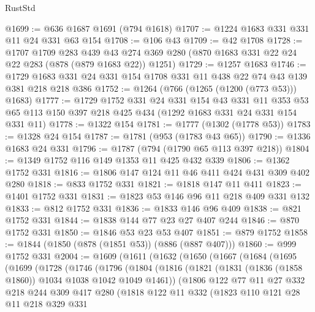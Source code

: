\begin{lexlean}{RustStd}
\begin{coremodule}
@1699 := @636 @1687 @1691 (@794 @1618)
@1707 := @1224 @1683 @331 @331 @11 @24 @331 @63 @154
@1708 := @106 @43
@1709 := @42 @1708
@1728 := @1707
    @1709
    @283
    @439
    @43
    @274
    @369
    @280
    (@870 @1683 @331 @22 @24 @22 @283 (@878 (@879 @1683 @22)) @1251)
@1729 := @1257 @1683
@1746 := @1729 @1683 @331 @24 @331 @154 @1708 @331 @11 @438 @22 @74 @43 @139 @381 @218 @218 @386
@1752 := @1264 (@766 (@1265 (@1200 (@773 @53))) @1683)
@1777 := @1729
    @1752
    @331
    @24
    @331
    @154
    @43
    @331
    @11
    @353
    @53
    @65
    @113
    @150
    @397
    @218
    @425
    @434
    (@1292 @1683 @331 @24 @331 @154 @331 @11)
@1778 := @1322 @154
@1781 := @1777 (@1302 (@1778 @53))
@1783 := @1328 @24 @154
@1787 := @1781 (@953 (@1783 @43 @65))
@1790 := @1336 @1683 @24 @331
@1796 := @1787 (@794 (@1790 @65 @113 @397 @218))
@1804 := @1349 @1752 @116 @149 @1353 @11 @425 @432 @339
@1806 := @1362 @1752 @331
@1816 := @1806 @147 @124 @11 @46 @411 @424 @431 @309 @402 @280
@1818 := @833 @1752 @331
@1821 := @1818 @147 @11 @411
@1823 := @1401 @1752 @331
@1831 := @1823 @53 @146 @96 @11 @218 @409 @331 @132
@1833 := @812 @1752 @331
@1836 := @1833 @146 @96 @409
@1838 := @821 @1752 @331
@1844 := @1838 @144 @77 @23 @27 @407 @244
@1846 := @870 @1752 @331
@1850 := @1846 @53 @23 @53 @407
@1851 := @879 @1752
@1858 := @1844 (@1850 (@878 (@1851 @53)) (@886 (@887 @407)))
@1860 := @999 @1752 @331
@2004 := @1609
    (@1611
      (@1632
        (@1650
          (@1667
            (@1684
              (@1695
                (@1699
                  (@1728
                    (@1746
                      (@1796
                        (@1804
                          (@1816
                            (@1821 (@1831 (@1836 (@1858 @1860)) @1034 @1038 @1042 @1049 @1461))
                            (@1806
                              @122
                              @77
                              @11
                              @27
                              @332
                              @218
                              @244
                              @309
                              @417
                              @280
                              (@1818
                                @122
                                @11
                                @332
                                (@1823
                                  @110
                                  @121
                                  @28
                                  @11
                                  @218
                                  @329
                                  @331

\end{coremodule}
\end{lexlean}
